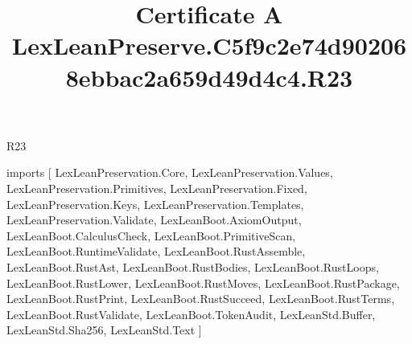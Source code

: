 \begin{lexlean}{R23}
\title{Certificate A LexLeanPreserve.C5f9c2e74d902068ebbac2a659d49d4c4.R23}
\begin{coremodule}
imports [
  LexLeanPreservation.Core,
  LexLeanPreservation.Values,
  LexLeanPreservation.Primitives,
  LexLeanPreservation.Fixed,
  LexLeanPreservation.Keys,
  LexLeanPreservation.Templates,
  LexLeanPreservation.Validate,
  LexLeanBoot.AxiomOutput,
  LexLeanBoot.CalculusCheck,
  LexLeanBoot.PrimitiveScan,
  LexLeanBoot.RuntimeValidate,
  LexLeanBoot.RustAssemble,
  LexLeanBoot.RustAst,
  LexLeanBoot.RustBodies,
  LexLeanBoot.RustLoops,
  LexLeanBoot.RustLower,
  LexLeanBoot.RustMoves,
  LexLeanBoot.RustPackage,
  LexLeanBoot.RustPrint,
  LexLeanBoot.RustSucceed,
  LexLeanBoot.RustTerms,
  LexLeanBoot.RustValidate,
  LexLeanBoot.TokenAudit,
  LexLeanStd.Buffer,
  LexLeanStd.Sha256,
  LexLeanStd.Text
]


\end{coremodule}
\end{lexlean}
